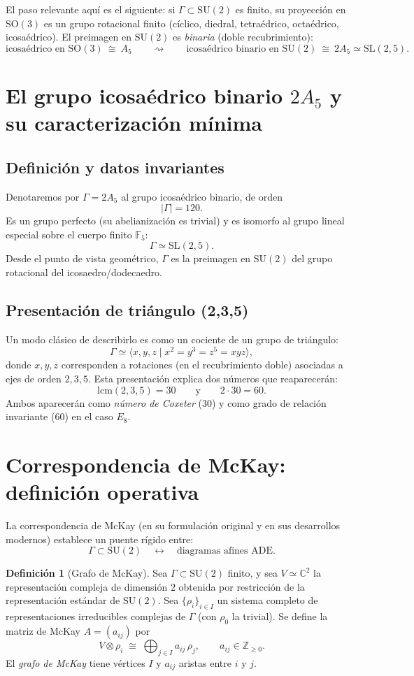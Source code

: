 \documentclass[11pt,a4paper]{article}
\theoremstyle{definition}
\newtheorem{definition}{Definición}
\theoremstyle{remark}
\begin{document}
El paso relevante aquí es el siguiente: si $\Gamma\subset \mathrm{SU}(2)$ es finito, su proyección en $\mathrm{SO}(3)$ es un grupo rotacional finito
(cíclico, diedral, tetraédrico, octaédrico, icosaédrico). El preimagen en $\mathrm{SU}(2)$ es \emph{binaria} (doble recubrimiento):
\[
\text{icosaédrico en }\mathrm{SO}(3)\ \cong\ A_5
\qquad\rightsquigarrow\qquad
\text{icosaédrico binario en }\mathrm{SU}(2)\ \cong\ 2A_5\simeq \mathrm{SL}(2,5).
\]

\section{El grupo icosaédrico binario $2A_5$ y su caracterización mínima}
\subsection{Definición y datos invariantes}
Denotaremos por $\Gamma=2A_5$ al grupo icosaédrico binario, de orden
\[
|\Gamma|=120.
\]
Es un grupo perfecto (su abelianización es trivial) y es isomorfo al grupo lineal especial sobre el cuerpo finito $\mathbb F_5$:
\[
\Gamma \simeq \mathrm{SL}(2,5).
\]
Desde el punto de vista geométrico, $\Gamma$ es la preimagen en $\mathrm{SU}(2)$ del grupo rotacional del icosaedro/dodecaedro.

\subsection{Presentación de triángulo (2,3,5)}
Un modo clásico de describirlo es como un cociente de un grupo de triángulo:
\[
\Gamma \simeq \langle x,y,z\mid x^2=y^3=z^5=xyz\rangle,
\]
donde $x,y,z$ corresponden a rotaciones (en el recubrimiento doble) asociadas a ejes de orden $2,3,5$.
Esta presentación explica dos números que reaparecerán:
\[
\mathrm{lcm}(2,3,5)=30
\qquad\text{y}\qquad
2\cdot 30=60.
\]
Ambos aparecerán como \emph{número de Coxeter} (30) y como grado de relación invariante (60) en el caso $E_8$.

\section{Correspondencia de McKay: definición operativa}
La correspondencia de McKay (en su formulación original y en sus desarrollos modernos) establece un puente rígido entre:
\[
\Gamma\subset \mathrm{SU}(2)
\quad\leftrightarrow\quad
\text{diagramas afines ADE}.
\]

\begin{definition}[Grafo de McKay]
Sea $\Gamma\subset \mathrm{SU}(2)$ finito, y sea $V\simeq\mathbb C^2$ la representación compleja de dimensión $2$ obtenida por restricción de la representación estándar de $\mathrm{SU}(2)$.
Sea $\{\rho_i\}_{i\in I}$ un sistema completo de representaciones irreducibles complejas de $\Gamma$ (con $\rho_0$ la trivial).
Se define la matriz de McKay $A=(a_{ij})$ por
\[
V\otimes \rho_i \;\cong\; \bigoplus_{j\in I} a_{ij}\,\rho_j,
\qquad a_{ij}\in\mathbb Z_{\ge 0}.
\]
El \emph{grafo de McKay} tiene vértices $I$ y $a_{ij}$ aristas entre $i$ y $j$.
\end{definition}
\end{document}
